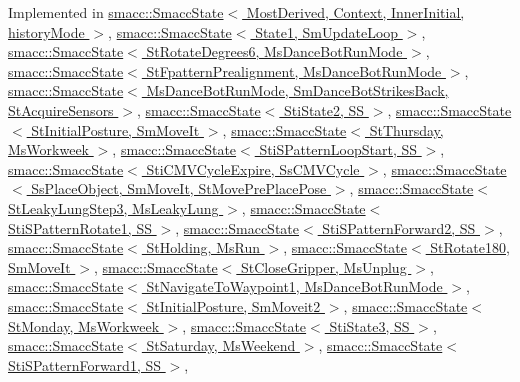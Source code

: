 Implemented in \hyperlink{classsmacc_1_1SmaccState_afc39f8e0ca4001b2159a100da2fccd0e}{smacc\+::\+Smacc\+State$<$ Most\+Derived, Context, Inner\+Initial, history\+Mode $>$}, \hyperlink{classsmacc_1_1SmaccState_afc39f8e0ca4001b2159a100da2fccd0e}{smacc\+::\+Smacc\+State$<$ State1, Sm\+Update\+Loop $>$}, \hyperlink{classsmacc_1_1SmaccState_afc39f8e0ca4001b2159a100da2fccd0e}{smacc\+::\+Smacc\+State$<$ St\+Rotate\+Degrees6, Ms\+Dance\+Bot\+Run\+Mode $>$}, \hyperlink{classsmacc_1_1SmaccState_afc39f8e0ca4001b2159a100da2fccd0e}{smacc\+::\+Smacc\+State$<$ St\+Fpattern\+Prealignment, Ms\+Dance\+Bot\+Run\+Mode $>$}, \hyperlink{classsmacc_1_1SmaccState_afc39f8e0ca4001b2159a100da2fccd0e}{smacc\+::\+Smacc\+State$<$ Ms\+Dance\+Bot\+Run\+Mode, Sm\+Dance\+Bot\+Strikes\+Back, St\+Acquire\+Sensors $>$}, \hyperlink{classsmacc_1_1SmaccState_afc39f8e0ca4001b2159a100da2fccd0e}{smacc\+::\+Smacc\+State$<$ Sti\+State2, S\+S $>$}, \hyperlink{classsmacc_1_1SmaccState_afc39f8e0ca4001b2159a100da2fccd0e}{smacc\+::\+Smacc\+State$<$ St\+Initial\+Posture, Sm\+Move\+It $>$}, \hyperlink{classsmacc_1_1SmaccState_afc39f8e0ca4001b2159a100da2fccd0e}{smacc\+::\+Smacc\+State$<$ St\+Thursday, Ms\+Workweek $>$}, \hyperlink{classsmacc_1_1SmaccState_afc39f8e0ca4001b2159a100da2fccd0e}{smacc\+::\+Smacc\+State$<$ Sti\+S\+Pattern\+Loop\+Start, S\+S $>$}, \hyperlink{classsmacc_1_1SmaccState_afc39f8e0ca4001b2159a100da2fccd0e}{smacc\+::\+Smacc\+State$<$ Sti\+C\+M\+V\+Cycle\+Expire, Ss\+C\+M\+V\+Cycle $>$}, \hyperlink{classsmacc_1_1SmaccState_afc39f8e0ca4001b2159a100da2fccd0e}{smacc\+::\+Smacc\+State$<$ Ss\+Place\+Object, Sm\+Move\+It, St\+Move\+Pre\+Place\+Pose $>$}, \hyperlink{classsmacc_1_1SmaccState_afc39f8e0ca4001b2159a100da2fccd0e}{smacc\+::\+Smacc\+State$<$ St\+Leaky\+Lung\+Step3, Ms\+Leaky\+Lung $>$}, \hyperlink{classsmacc_1_1SmaccState_afc39f8e0ca4001b2159a100da2fccd0e}{smacc\+::\+Smacc\+State$<$ Sti\+S\+Pattern\+Rotate1, S\+S $>$}, \hyperlink{classsmacc_1_1SmaccState_afc39f8e0ca4001b2159a100da2fccd0e}{smacc\+::\+Smacc\+State$<$ Sti\+S\+Pattern\+Forward2, S\+S $>$}, \hyperlink{classsmacc_1_1SmaccState_afc39f8e0ca4001b2159a100da2fccd0e}{smacc\+::\+Smacc\+State$<$ St\+Holding, Ms\+Run $>$}, \hyperlink{classsmacc_1_1SmaccState_afc39f8e0ca4001b2159a100da2fccd0e}{smacc\+::\+Smacc\+State$<$ St\+Rotate180, Sm\+Move\+It $>$}, \hyperlink{classsmacc_1_1SmaccState_afc39f8e0ca4001b2159a100da2fccd0e}{smacc\+::\+Smacc\+State$<$ St\+Close\+Gripper, Ms\+Unplug $>$}, \hyperlink{classsmacc_1_1SmaccState_afc39f8e0ca4001b2159a100da2fccd0e}{smacc\+::\+Smacc\+State$<$ St\+Navigate\+To\+Waypoint1, Ms\+Dance\+Bot\+Run\+Mode $>$}, \hyperlink{classsmacc_1_1SmaccState_afc39f8e0ca4001b2159a100da2fccd0e}{smacc\+::\+Smacc\+State$<$ St\+Initial\+Posture, Sm\+Moveit2 $>$}, \hyperlink{classsmacc_1_1SmaccState_afc39f8e0ca4001b2159a100da2fccd0e}{smacc\+::\+Smacc\+State$<$ St\+Monday, Ms\+Workweek $>$}, \hyperlink{classsmacc_1_1SmaccState_afc39f8e0ca4001b2159a100da2fccd0e}{smacc\+::\+Smacc\+State$<$ Sti\+State3, S\+S $>$}, \hyperlink{classsmacc_1_1SmaccState_afc39f8e0ca4001b2159a100da2fccd0e}{smacc\+::\+Smacc\+State$<$ St\+Saturday, Ms\+Weekend $>$}, \hyperlink{classsmacc_1_1SmaccState_afc39f8e0ca4001b2159a100da2fccd0e}{smacc\+::\+Smacc\+State$<$ Sti\+S\+Pattern\+Forward1, S\+S $>$}, 